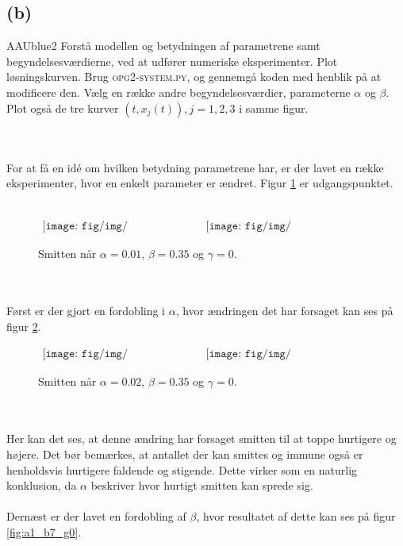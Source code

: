 \subsection*{(b) }
%
\begin{color}{AAUblue2}
%
Forstå modellen og betydningen af parametrene samt begyndelsesværdierne, ved at udfører numeriske eksperimenter. 
Plot løsningskurven. 
Brug \textsc{opg2-system.py}, og gennemgå koden med henblik på at modificere den. 
Vælg en række andre begyndelsesværdier, parameterne $\alpha$ og $\beta$. Plot også de tre kurver $(t, x_j(t)), j = 1,2,3$ i samme figur.
% 
\end{color}
\\\\
% 
For at få en idé om hvilken betydning parametrene har, er der lavet en række eksperimenter, hvor en enkelt parameter er ændret.
Figur \ref{fig:a1_b35_g0} er udgangspunktet.\\\\
%
\begin{figure}[!ht]
\centering
$
\begin{matrix}
\texttt{[image: fig/img/a1\_b35\_g0.png]}&
\texttt{[image: fig/img/t\_a1\_b35\_g0.png]}
\end{matrix}
$
\caption{Smitten når $\alpha = 0.01$, $\beta = 0.35$ og $\gamma = 0$.}
\label{fig:a1_b35_g0}
\end{figure}\\\\
%
Først er der gjort en fordobling i $\alpha$, hvor ændringen det har forsaget kan ses på figur \ref{fig:a2_b35_g0}.
%
\begin{figure}[!ht]
\centering
$
\begin{matrix}
\texttt{[image: fig/img/a2\_b35\_g0.png]}&
\texttt{[image: fig/img/t\_a2\_b35\_g0.png]}
\end{matrix}
$
\caption{Smitten når $\alpha = 0.02$, $\beta = 0.35$ og $\gamma = 0$.}
\label{fig:a2_b35_g0}
\end{figure}\\\\
%
Her kan det ses, at denne ændring har forsaget smitten til at toppe hurtigere og højere.
Det bør bemærkes, at antallet der kan smittes og immune også er henholdsvis hurtigere faldende og stigende.
Dette virker som en naturlig konklusion, da $\alpha$ beskriver hvor hurtigt smitten kan sprede sig.\\\\
%
Dernæst er der lavet en fordobling af $\beta$, hvor resultatet af dette kan ses på figur \ref{fig:a1_b7_g0}.\\\\
